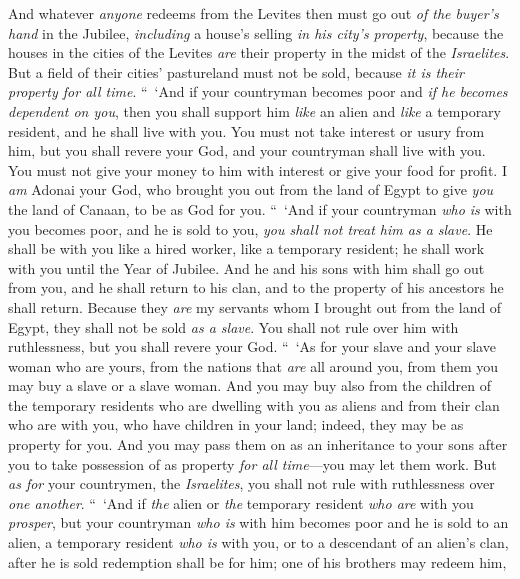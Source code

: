 \begin{biblechapter}
\verse And whatever \textit{anyone} redeems from the Levites then must go out \textit{of the buyer’s hand} in the Jubilee, \textit{including} a house’s selling \textit{in his city’s property}, because the houses in the cities of the Levites \textit{are} their property in the midst of the \textit{Israelites}.
\verse But a field of their cities’ pastureland must not be sold, because \textit{it is their property for all time}.
\verse “ ‘And if your countryman becomes poor and \textit{if he becomes dependent on you}, then you shall support him \textit{like} an alien and \textit{like} a temporary resident, and he shall live with you.
\verse You must not take interest or usury from him, but you shall revere your God, and your countryman shall live with you.
\verse You must not give your money to him with interest or give your food for profit.
\verse I \textit{am} Adonai your God, who brought you out from the land of Egypt to give \textit{you} the land of Canaan, to be as God for you.
\verse “ ‘And if your countryman \textit{who is} with you becomes poor, and he is sold to you, \textit{you shall not treat him as a slave}.
\verse He shall be with you like a hired worker, like a temporary resident; he shall work with you until the Year of Jubilee.
\verse And he and his sons with him shall go out from you, and he shall return to his clan, and to the property of his ancestors he shall return.
\verse Because they \textit{are} my servants whom I brought out from the land of Egypt, they shall not be sold \textit{as a slave}.
\verse You shall not rule over him with ruthlessness, but you shall revere your God.
\verse “ ‘As for your slave and your slave woman who are yours, from the nations that \textit{are} all around you, from them you may buy a slave or a slave woman.
\verse And you may buy also from the children of the temporary residents who are dwelling with you as aliens and from their clan who are with you, who have children in your land; indeed, they may be as property for you.
\verse And you may pass them on as an inheritance to your sons after you to take possession of as property \textit{for all time}—you may let them work. But \textit{as for} your countrymen, the \textit{Israelites}, you shall not rule with ruthlessness over \textit{one another}.
\verse “ ‘And if \textit{the} alien or \textit{the} temporary resident \textit{who are} with you \textit{prosper}, but your countryman \textit{who is} with him becomes poor and he is sold to an alien, a temporary resident \textit{who is} with you, or to a descendant of an alien’s clan,
\verse after he is sold redemption shall be for him; one of his brothers may redeem him,

\end{biblechapter}
